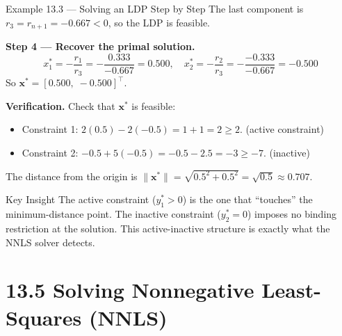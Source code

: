 \documentclass[aspectratio=169,10pt]{beamer}
\newcommand{\bx}{\mathbf{x}}
\begin{document}
\begin{frame}[allowframebreaks]{Example 13.3 --- Solving an LDP Step by Step}
  The last component is $r_3 = r_{n+1} = -0.667 < 0$, so the LDP is feasible. \checkmark

  \textbf{Step 4 --- Recover the primal solution.}
  \[
    x_1^* = -\frac{r_1}{r_3} = -\frac{0.333}{-0.667} = 0.500,
    \quad
    x_2^* = -\frac{r_2}{r_3} = -\frac{-0.333}{-0.667} = -0.500
  \]
  So $\bx^* = [0.500,\; -0.500]^{\top}$.

  \textbf{Verification.}  Check that $\bx^*$ is feasible:
  \begin{itemize}
    \item Constraint 1: $2(0.5) - 2(-0.5) = 1 + 1 = 2 \geq 2$. \checkmark (active constraint)
    \item Constraint 2: $-0.5 + 5(-0.5) = -0.5 - 2.5 = -3 \geq -7$. \checkmark (inactive)
  \end{itemize}
  The distance from the origin is $\|\bx^*\| = \sqrt{0.5^2 + 0.5^2} = \sqrt{0.5} \approx 0.707$.

  \begin{alertblock}{Key Insight}
    The active constraint ($y_1^* > 0$) is the one that ``touches'' the minimum-distance
    point.  The inactive constraint ($y_2^* = 0$) imposes no binding restriction at the
    solution.  This active-inactive structure is exactly what the NNLS solver detects.
  \end{alertblock}

\end{frame}

\section{13.5 Solving Nonnegative Least-Squares (NNLS)}
\end{document}
